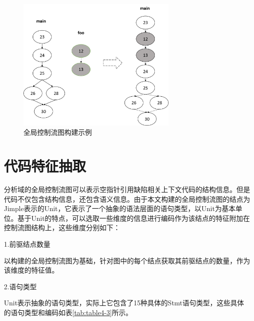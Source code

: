 \begin{figure}
	\centering
	\includegraphics[width=0.70\textwidth]{figures/ICFG4-6}
	\caption{全局控制流图构建示例}\label{fig:figure4-6}
\end{figure}



\section{代码特征抽取}
分析域的全局控制流图可以表示空指针引用缺陷相关上下文代码的结构信息。但是代码不仅包含结构信息，还包含语义信息。由于本文构建的全局控制流图的结点为Jimple表示的Unit，它表示了一个抽象的语法层面的语句类型，以Unit为基本单位。基于Unit的特点，可以选取一些维度的信息进行编码作为该结点的特征附加在控制流图结构上，这些维度分别如下：

1.前驱结点数量

以构建的全局控制流图为基础，针对图中的每个结点获取其前驱结点的数量，作为该维度的特征值。

2.语句类型

Unit表示抽象的语句类型，实际上它包含了15种具体的Stmt语句类型，这些具体的语句类型和编码如表\ref{tab:table4-3}所示。

